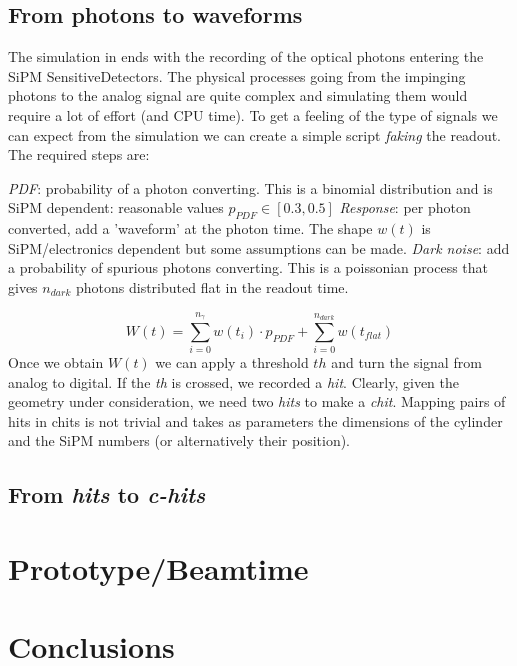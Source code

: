 \begin{refsection}
    \subsection{From photons to waveforms}
        The simulation in \gf ends with the recording of the optical photons entering the SiPM SensitiveDetectors.
        The physical processes going from the impinging photons to the analog signal are quite complex and simulating them would require a lot of effort (and CPU time).
        To get a feeling of the type of signals we can expect from the simulation we can create a simple script \textit{faking} the readout.
        The required steps are:
        \begin{outline}
            \1 \textit{PDF}: probability of a photon converting. 
            This is a binomial distribution and is SiPM dependent: reasonable values $p_{PDF}\in [0.3, 0.5]$
            \1 \textit{Response}: per photon converted, add a 'waveform' at the photon time. 
            The shape $w(t)$ is SiPM/electronics dependent but some assumptions can be made.
            \1 \textit{Dark noise}: add a probability of spurious photons converting. 
            This is a poissonian process that gives $n_{dark}$ photons distributed flat in the readout time.
        \end{outline}
        \begin{equation}
            W(t)=\sum_{i=0}^{n_\gamma} w(t_i)\cdot p_{PDF} + \sum_{i=0}^{n_{dark}} w(t_{flat})
        \end{equation}
        Once we obtain $W(t)$ we can apply a threshold $th$ and turn the signal from analog to digital. 
        If the \textit{th} is crossed, we recorded a \textit{hit}.
        Clearly, given the geometry under consideration, we need two \textit{hits} to make a \textit{chit}.
        Mapping pairs of hits in chits is not trivial and takes as parameters the dimensions of the cylinder and the SiPM numbers (or alternatively their position).

    \subsection{From \textit{hits} to \textit{c-hits}}

\section{Prototype/Beamtime}

\section{Conclusions}

\printbibliography[title=Bibliography on muEDM positron tracker]
\end{refsection}